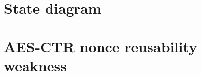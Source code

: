 \documentclass[../main.tex]{subfiles}
\begin{document}
\section{State diagram}
    \label{appendix:state_diagram}
    \newpage
    
\section{AES-CTR nonce reusability weakness}
    \label{appendix:ctr_nonce_weakness}
    
\end{document}
